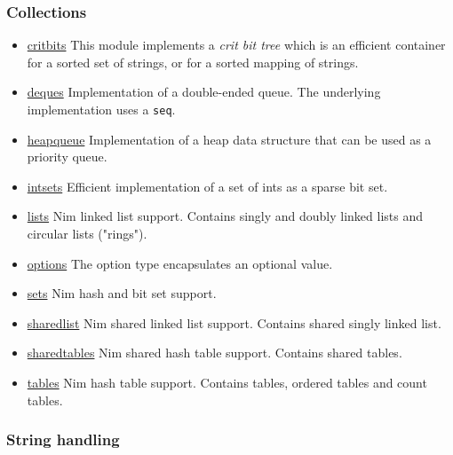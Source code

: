\hypertarget{collections}{%
\subsubsection{Collections}\label{collections}}

\begin{itemize}
\tightlist
\item
  \href{critbits.html}{critbits} This module implements a \emph{crit bit
  tree} which is an efficient container for a sorted set of strings, or
  for a sorted mapping of strings.
\item
  \href{deques.html}{deques} Implementation of a double-ended queue. The
  underlying implementation uses a \texttt{seq}.
\item
  \href{heapqueue.html}{heapqueue} Implementation of a heap data
  structure that can be used as a priority queue.
\item
  \href{intsets.html}{intsets} Efficient implementation of a set of ints
  as a sparse bit set.
\item
  \href{lists.html}{lists} Nim linked list support. Contains singly and
  doubly linked lists and circular lists ("rings").
\item
  \href{options.html}{options} The option type encapsulates an optional
  value.
\item
  \href{sets.html}{sets} Nim hash and bit set support.
\item
  \href{sharedlist.html}{sharedlist} Nim shared linked list support.
  Contains shared singly linked list.
\item
  \href{sharedtables.html}{sharedtables} Nim shared hash table support.
  Contains shared tables.
\item
  \href{tables.html}{tables} Nim hash table support. Contains tables,
  ordered tables and count tables.
\end{itemize}

\hypertarget{string-handling}{%
\subsubsection{String handling}\label{string-handling}}


